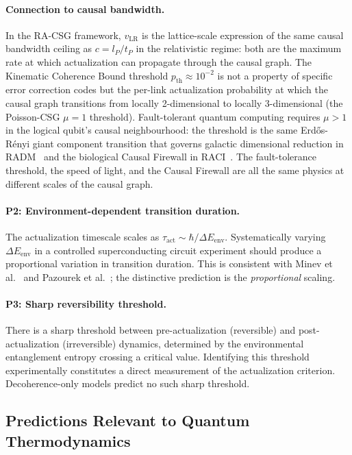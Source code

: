 \documentclass[11pt,a4paper]{article}
\theoremstyle{plain}
\theoremstyle{definition}
\theoremstyle{remark}
\begin{document}
\paragraph{Connection to causal bandwidth.}
In the RA-CSG framework, $v_{\mathrm{LR}}$ is the lattice-scale expression
of the same causal bandwidth ceiling as $c = l_P/t_P$ in the relativistic
regime: both are the maximum rate at which actualization can propagate
through the causal graph. The Kinematic Coherence Bound threshold
$p_{\mathrm{th}} \approx 10^{-2}$ is not a property of specific error
correction codes but the per-link actualization probability at which
the causal graph transitions from locally 2-dimensional to locally
3-dimensional (the Poisson-CSG $\mu = 1$ threshold). Fault-tolerant
quantum computing requires $\mu > 1$ in the logical qubit's causal
neighbourhood: the threshold is the same Erd\H{o}s-R\'{e}nyi giant
component transition that governs galactic dimensional reduction in
RADM~\citep{Sandeman2026RADM} and the biological Causal Firewall
in RACI~\citep{Sandeman2026RACI}. The fault-tolerance threshold,
the speed of light, and the Causal Firewall are all the same
physics at different scales of the causal graph.

\paragraph{P2: Environment-dependent transition duration.}
The actualization timescale scales as $\tau_{\mathrm{act}} \sim \hbar / \Delta
E_{\mathrm{env}}$. Systematically varying $\Delta E_{\mathrm{env}}$ in a
controlled superconducting circuit experiment should produce a proportional
variation in transition duration. This is consistent with Minev et
al.~\citep{Minev2019} and Pazourek et al.~\citep{Pazourek2015}; the distinctive
prediction is the \emph{proportional} scaling.

\paragraph{P3: Sharp reversibility threshold.}
There is a sharp threshold between pre-actualization (reversible) and
post-actualization (irreversible) dynamics, determined by the environmental
entanglement entropy crossing a critical value. Identifying this threshold
experimentally constitutes a direct measurement of the actualization criterion.
Decoherence-only models predict no such sharp threshold.

\subsection{Predictions Relevant to Quantum Thermodynamics}
\end{document}

